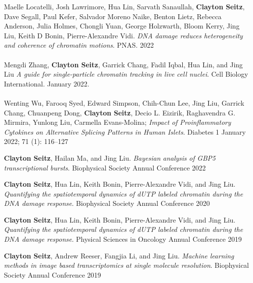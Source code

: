 \documentclass[margin, 10pt]{res} %
\begin{document}
\begin{resume}
Maelle Locatelli\textsuperscript{\textdagger}, Josh Lawrimore\textsuperscript{\textdagger}, Hua Lin\textsuperscript{\textdagger}, Sarvath Sanaullah, \textbf{Clayton Seitz}, Dave Segall, Paul Kefer, Salvador Moreno Naike, Benton Lietz, Rebecca Anderson, Julia Holmes, Chongli Yuan, George Holzwarth, Bloom Kerry, Jing Liu, Keith D Bonin, Pierre-Alexandre Vidi. \textit{DNA damage reduces heterogeneity and coherence of chromatin motions}. PNAS. 2022
\\
\\
Mengdi Zhang, \textbf{Clayton Seitz}, Garrick Chang, Fadil Iqbal, Hua Lin, and Jing Liu \textit{A guide for single-particle chromatin tracking in live cell nuclei}. Cell Biology International. January 2022.
\\
\\
Wenting Wu, Farooq Syed, Edward Simpson, Chih-Chun Lee, Jing Liu, Garrick Chang, Chuanpeng Dong, \textbf{Clayton Seitz}, Decio L. Eizirik, Raghavendra G. Mirmira, Yunlong Liu, Carmella Evans-Molina; \textit{Impact of Proinflammatory Cytokines on Alternative Splicing Patterns in Human Islets}. Diabetes 1 January 2022; 71 (1): 116–127

\textbf{Clayton Seitz}, Hailan Ma, and Jing Liu. \textit{Bayesian analysis of GBP5 transcriptional bursts}. Biophysical Society Annual Conference 2022

\textbf{Clayton Seitz}, Hua Lin, Keith Bonin, Pierre-Alexandre Vidi, and Jing Liu. \textit{Quantifying the spatiotemporal dynamics of dUTP labeled chromatin during the DNA damage response}. Biophysical Society Annual Conference 2020

\textbf{Clayton Seitz}, Hua Lin, Keith Bonin, Pierre-Alexandre Vidi, and Jing Liu. \textit{Quantifying the spatiotemporal dynamics of dUTP labeled chromatin during the DNA damage response}. Physical Sciences in Oncology Annual Conference 2019

\textbf{Clayton Seitz}, Andrew Reeser, Fangjia Li, and Jing Liu. \textit{Machine learning methods in image based transcriptomics at single molecule resolution}. Biophysical Society Annual Conference 2019


\end{resume}
\end{document}
